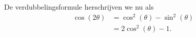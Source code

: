 \documentclass{article}
\begin{document}
    \setcounter{section}{3}
    \setcounter{equation}{6}
    De verdubbelingsformule herschrijven we nu als
    \begin{align}
        \cos(2\theta) &= \cos^2(\theta) - \sin^2(\theta)\nonumber\\
        &= 2\cos^2(\theta)-1.
    \end{align}
\end{document}
